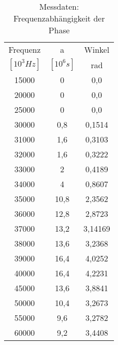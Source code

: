\begin{table}[h!]
  \centering
  \caption{Messdaten: Frequenzabhängigkeit der Phase}
  \label{tab:amp}
  \begin{tabular}{c c c}
    \toprule
Frequenz & a &Winkel\\
$[10^{3}Hz]$ & $[10^{6}s]$ &rad\\
    \midrule
    15000 &	0     & 0,0\\
    20000 &	0     & 0,0\\
    25000 &	0     & 0,0\\
    30000 &	0,8   & 0,1514\\
    31000 &	1,6   & 0,3103\\
    32000 &	1,6   & 0,3222\\
    33000 &	2     & 0,4189\\
    34000 &	4     & 0,8607\\
    35000 &	10,8  & 2,3562\\
    36000 &	12,8  & 2,8723\\
    37000 &	13,2  & 3,14169\\
    38000 &	13,6  & 3,2368\\
    39000 &	16,4  & 4,0252\\
    40000 &	16,4  & 4,2231\\
    45000 &	13,6  & 3,8841\\
    50000 &	10,4  & 3,2673\\
    55000 &	9,6   & 3,2782\\
    60000 &	9,2   & 3,4408\\



    \bottomrule
  \end{tabular}
\end{table}
